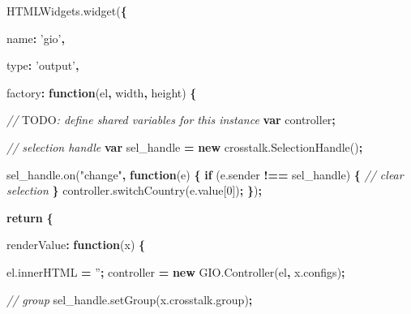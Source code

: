 \documentclass[10pt,]{krantz}
\makeatletter
\newenvironment{Shaded}{\begin{snugshade}}{\end{snugshade}}
\newcommand{\AlertTok}[1]{\textcolor[rgb]{0.33,0.33,0.33}{#1}}
\newcommand{\AttributeTok}[1]{\textcolor[rgb]{0.61,0.61,0.61}{#1}}
\newcommand{\CommentTok}[1]{\textcolor[rgb]{0.37,0.37,0.37}{\textit{#1}}}
\newcommand{\ControlFlowTok}[1]{\textcolor[rgb]{0.27,0.27,0.27}{\textbf{#1}}}
\newcommand{\DataTypeTok}[1]{\textcolor[rgb]{0.27,0.27,0.27}{#1}}
\newcommand{\DecValTok}[1]{\textcolor[rgb]{0.06,0.06,0.06}{#1}}
\newcommand{\KeywordTok}[1]{\textcolor[rgb]{0.27,0.27,0.27}{\textbf{#1}}}
\newcommand{\NormalTok}[1]{#1}
\newcommand{\OperatorTok}[1]{\textcolor[rgb]{0.43,0.43,0.43}{\textbf{#1}}}
\newcommand{\StringTok}[1]{\textcolor[rgb]{0.5,0.5,0.5}{#1}}
\newcommand{\VariableTok}[1]{\textcolor[rgb]{0,0,0}{#1}}
\newenvironment{kframe}{%
\medskip{}
\setlength{\fboxsep}{.8em}
 \def\at@end@of@kframe{}%
 \ifinner\ifhmode%
  \def\at@end@of@kframe{\end{minipage}}%
  \begin{minipage}{\columnwidth}%
 \fi\fi%
 \def\FrameCommand##1{\hskip\@totalleftmargin \hskip-\fboxsep
 \colorbox{shadecolor}{##1}\hskip-\fboxsep
     \hskip-\linewidth \hskip-\@totalleftmargin \hskip\columnwidth}%
 \MakeFramed {\advance\hsize-\width
   \@totalleftmargin\z@ \linewidth\hsize
   \@setminipage}}%
 {\par\unskip\endMakeFramed%
 \at@end@of@kframe}
\renewenvironment{Shaded}{\begin{kframe}}{\end{kframe}}
\makeatother
\begin{document}
\begin{Shaded}
\begin{Highlighting}[]
\VariableTok{HTMLWidgets}\NormalTok{.}\AttributeTok{widget}\NormalTok{(}\OperatorTok{\{}

  \DataTypeTok{name}\OperatorTok{:} \StringTok{'gio'}\OperatorTok{,}

  \DataTypeTok{type}\OperatorTok{:} \StringTok{'output'}\OperatorTok{,}

  \DataTypeTok{factory}\OperatorTok{:} \KeywordTok{function}\NormalTok{(el}\OperatorTok{,}\NormalTok{ width}\OperatorTok{,}\NormalTok{ height) }\OperatorTok{\{}

    \CommentTok{// }\AlertTok{TODO}\CommentTok{: define shared variables for this instance}
    \KeywordTok{var}\NormalTok{ controller}\OperatorTok{;}

    \CommentTok{// selection handle}
    \KeywordTok{var}\NormalTok{ sel_handle }\OperatorTok{=} \KeywordTok{new} \VariableTok{crosstalk}\NormalTok{.}\AttributeTok{SelectionHandle}\NormalTok{()}\OperatorTok{;}

    \VariableTok{sel_handle}\NormalTok{.}\AttributeTok{on}\NormalTok{(}\StringTok{"change"}\OperatorTok{,} \KeywordTok{function}\NormalTok{(e) }\OperatorTok{\{}
      \ControlFlowTok{if}\NormalTok{ (}\VariableTok{e}\NormalTok{.}\AttributeTok{sender} \OperatorTok{!==}\NormalTok{ sel_handle) }\OperatorTok{\{}
        \CommentTok{// clear selection}
      \OperatorTok{\}}
      \VariableTok{controller}\NormalTok{.}\AttributeTok{switchCountry}\NormalTok{(}\VariableTok{e}\NormalTok{.}\AttributeTok{value}\NormalTok{[}\DecValTok{0}\NormalTok{])}\OperatorTok{;}
    \OperatorTok{\}}\NormalTok{)}\OperatorTok{;}


    \ControlFlowTok{return} \OperatorTok{\{}

      \DataTypeTok{renderValue}\OperatorTok{:} \KeywordTok{function}\NormalTok{(x) }\OperatorTok{\{}

        \VariableTok{el}\NormalTok{.}\AttributeTok{innerHTML} \OperatorTok{=} \StringTok{''}\OperatorTok{;}
\NormalTok{        controller }\OperatorTok{=} \KeywordTok{new} \VariableTok{GIO}\NormalTok{.}\AttributeTok{Controller}\NormalTok{(el}\OperatorTok{,} \VariableTok{x}\NormalTok{.}\AttributeTok{configs}\NormalTok{)}\OperatorTok{;}

        \CommentTok{// group}
        \VariableTok{sel_handle}\NormalTok{.}\AttributeTok{setGroup}\NormalTok{(}\VariableTok{x}\NormalTok{.}\VariableTok{crosstalk}\NormalTok{.}\AttributeTok{group}\NormalTok{)}\OperatorTok{;}
        

\end{Highlighting}
\end{Shaded}
\end{document}
